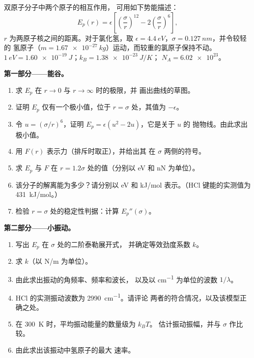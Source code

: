 \begin{problem}
\label{pb:b1:work-and-energy:1}
双原子分子中两个原子的相互作用，
可用如下势能描述：
\[
E_p(r) = \epsilon\left[\left(\frac{\sigma}{r}\right)^{12} - 2\left(\frac{\sigma}{r}\right)^{6}\right],
\]
$r$ 为两原子核之间的距离。对于氯化氢，取
$\epsilon = \qty{4.4}{eV}$，$\sigma = \qty{0.127}{nm}$，并令较轻的
氢原子（$m = \qty{1.67e-27}{kg}$）运动，而较重的氯原子保持不动。
$\qty{1}{eV} = \qty{1.60e-19}{J}$；$k_B = \qty{1.38e-23}{J/K}$；
$N_A = \num{6.02e23}$。

\medskip
\noindent\textbf{第一部分——能谷。}
\begin{enumerate}
  \item 求 $E_p$ 在 $r \to 0$ 与 $r \to \infty$ 时的极限，并
        画出曲线的草图。
  \item 证明 $E_p$ 仅有一个极小值，位于 $r = \sigma$ 处，其值为
        $-\epsilon$。
  \item 令 $u = (\sigma/r)^6$，证明 $E_p = \epsilon(u^2 - 2u)$，它是关于 $u$ 的
        抛物线。由此求出极小值。
  \item 用 $F(r)$ 表示力（排斥时取正），并给出其
        在 $\sigma$ 两侧的符号。
  \item 求 $E_p$ 与 $F$ 在 $r = 1.2\sigma$ 处的值（分别以 eV 和 nN 为单位）。
  \item 该分子的解离能为多少？请分别以 eV 和
        \unit{kJ/mol} 表示。（HCl 键能的实测值为 \qty{431}{kJ/mol}。）
  \item 检验 $r = \sigma$ 处的稳定性判据：计算
        $E_p''(\sigma)$。
\end{enumerate}

\medskip
\noindent\textbf{第二部分——小振动。}
\begin{enumerate}[resume]
  \item 写出 $E_p$ 在 $\sigma$ 处的二阶泰勒展开式，
        并确定等效劲度系数 $k$。
  \item 求 $k$（以 \unit{N/m} 为单位）。
  \item 由此求出振动的角频率、频率和波长，
        以及以 \unit{cm^{-1}} 为单位的波数 $1/\lambda$。
  \item HCl 的实测振动波数为 \qty{2990}{cm^{-1}}。请评论
        两者的符合情况，以及该模型正确之处。
  \item 在 \qty{300}{K} 时，平均振动能量的数量级为 $k_BT$。
        估计振动振幅，并与 $\sigma$ 作比较。
  \item 由此求出该振动中氢原子的最大
        速率。
\end{enumerate}


\end{problem}
